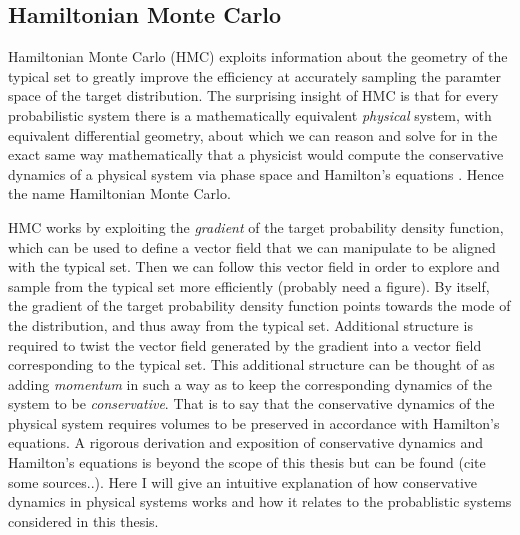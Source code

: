 \subsection{Hamiltonian Monte Carlo}
Hamiltonian Monte Carlo (HMC) exploits information about the geometry of the typical set to greatly improve the efficiency at accurately sampling the paramter space of the target distribution. The surprising insight of HMC is that for every probabilistic system there is a mathematically equivalent \textit{physical} system, with equivalent differential geometry, about which we can reason and solve for in the exact same way mathematically that a physicist would compute the conservative dynamics of a physical system via phase space and Hamilton's equations \cite{Betancourt2017}. Hence the name Hamiltonian Monte Carlo.

HMC works by exploiting the \textit{gradient} of the target probability density function, which can be used to define a vector field that we can manipulate to be aligned with the typical set. Then we can follow this vector field in order to explore and sample from the typical set more efficiently (probably need a figure). By itself, the gradient of the target probability density function points towards the mode of the distribution, and thus away from the typical set. Additional structure is required to twist the vector field generated by the gradient into a vector field corresponding to the typical set. This additional structure can be thought of as adding \textit{momentum} in such a way as to keep the corresponding dynamics of the system to be \textit{conservative}. That is to say that the conservative dynamics of the physical system requires volumes to be preserved in accordance with Hamilton's equations. A rigorous derivation and exposition of conservative dynamics and Hamilton's equations is beyond the scope of this thesis but can be found (cite some sources..). Here I will give an intuitive explanation of how conservative dynamics in physical systems works and how it relates to the probablistic systems considered in this thesis.


